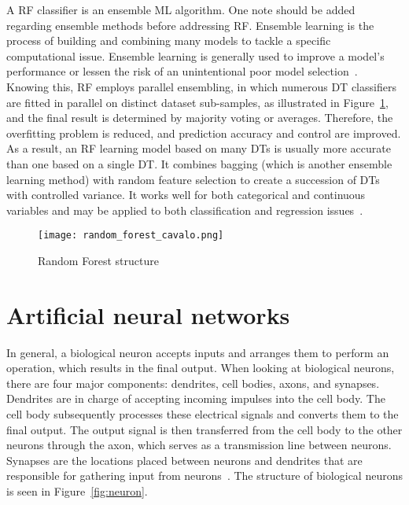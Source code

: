 A \gls{RF} classifier is an ensemble \gls{ML} algorithm. One note should be added regarding ensemble methods before addressing \gls{RF}. Ensemble learning is the process of building and combining many models to tackle a specific computational issue. Ensemble learning is generally used to improve a model's performance or lessen the risk of an unintentional poor model selection~\cite{Mahesh2019MachineReview}. Knowing this, \gls{RF} employs parallel ensembling, in which numerous \gls{DT} classifiers are fitted in parallel on distinct dataset sub-samples, as illustrated in Figure~\ref{fig:random_forest2}, and the final result is determined by majority voting or averages. Therefore, the overfitting problem is reduced, and prediction accuracy and control are improved. As a result, an \gls{RF} learning model based on many \gls{DT}s is usually more accurate than one based on a single \gls{DT}. It combines bagging (which is another ensemble learning method) with random feature selection to create a succession of \gls{DT}s with controlled variance. It works well for both categorical and continuous variables and may be applied to both classification and regression issues~\cite{Sarker2021MachineDirections}.

\begin{figure}[htbp]
    \centering
    \texttt{[image: random\_forest\_cavalo.png]}
    \caption{Random Forest structure~\cite{Sarker2021MachineDirections}}
    \label{fig:random_forest2}
\end{figure}

\section{Artificial neural networks}\label{sec:ann}

In general, a biological neuron accepts inputs and arranges them to perform an operation, which results in the final output. When looking at biological neurons, there are four major components: dendrites, cell bodies, axons, and synapses. Dendrites are in charge of accepting incoming impulses into the cell body. The cell body subsequently processes these electrical signals and converts them to the final output. The output signal is then transferred from the cell body to the other neurons through the axon, which serves as a transmission line between neurons. Synapses are the locations placed between neurons and dendrites that are responsible for gathering input from neurons~\cite{Imran2019AClassification}. The structure of biological neurons is seen in Figure~\ref{fig:neuron}. 
    
